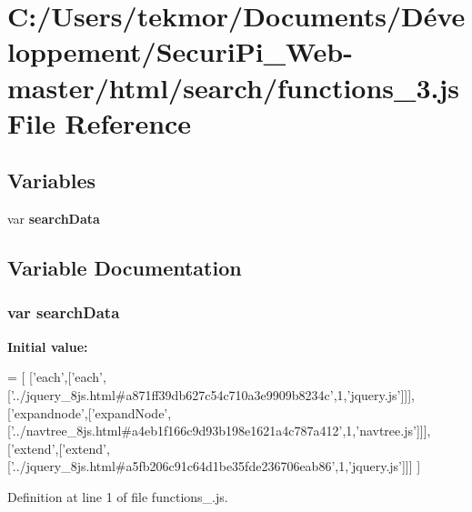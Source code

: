 \section{C\+:/\+Users/tekmor/\+Documents/\+Développement/\+Securi\+Pi\+\_\+\+Web-\/master/html/search/functions\+\_\+3.js File Reference}
\label{functions__3_8js}
\subsection*{Variables}
\begin{DoxyCompactItemize}
\item 
var {\bf search\+Data}
\end{DoxyCompactItemize}


\subsection{Variable Documentation}
\subsubsection[{search\+Data}]{\setlength{\rightskip}{0pt plus 5cm}var search\+Data}\label{functions__3_8js_ad01a7523f103d6242ef9b0451861231e}
{\bfseries Initial value\+:}
\begin{DoxyCode}
=
[
  [\textcolor{stringliteral}{'each'},[\textcolor{stringliteral}{'each'},[\textcolor{stringliteral}{'../jquery\_8js.html#a871ff39db627c54c710a3e9909b8234c'},1,\textcolor{stringliteral}{'jquery.js'}]]],
  [\textcolor{stringliteral}{'expandnode'},[\textcolor{stringliteral}{'expandNode'},[\textcolor{stringliteral}{'../navtree\_8js.html#a4eb1f166c9d93b198e1621a4c787a412'},1,\textcolor{stringliteral}{'navtree.js'}]]],
  [\textcolor{stringliteral}{'extend'},[\textcolor{stringliteral}{'extend'},[\textcolor{stringliteral}{'../jquery\_8js.html#a5fb206c91c64d1be35fde236706eab86'},1,\textcolor{stringliteral}{'jquery.js'}]]]
]
\end{DoxyCode}


Definition at line 1 of file functions\+\_.\+js.

